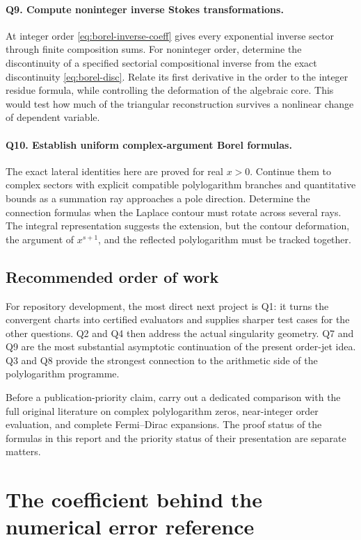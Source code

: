 \documentclass[11pt,a4paper]{article}
\numberwithin{equation}{section}
\theoremstyle{definition}
\theoremstyle{remark}
\begin{document}
\paragraph{Q9. Compute noninteger inverse Stokes transformations.}
At integer order \eqref{eq:borel-inverse-coeff} gives every
exponential inverse sector through finite composition sums.
For noninteger order, determine the discontinuity of a specified
sectorial compositional inverse from the exact discontinuity
\eqref{eq:borel-disc}. Relate its first derivative in the order
to the integer residue formula, while controlling the deformation
of the algebraic core. This would test how much of the triangular
reconstruction survives a nonlinear change of dependent variable.

\paragraph{Q10. Establish uniform complex-argument Borel formulas.}
The exact lateral identities here are proved for real $x>0$.
Continue them to complex sectors with explicit compatible
polylogarithm branches and quantitative bounds as a summation
ray approaches a pole direction. Determine the connection
formulas when the Laplace contour must rotate across several
rays. The integral representation suggests the extension, but
the contour deformation, the argument of $x^{s+1}$, and the
reflected polylogarithm must be tracked together.

\subsection{Recommended order of work}

For repository development, the most direct next project is Q1:
it turns the convergent charts into certified evaluators and
supplies sharper test cases for the other questions. Q2 and Q4
then address the actual singularity geometry. Q7 and Q9 are the
most substantial asymptotic continuation of the present order-jet
idea. Q3 and Q8 provide the strongest connection to the arithmetic
side of the polylogarithm programme.

Before a publication-priority claim, carry out a dedicated comparison
with the full original literature on complex polylogarithm zeros,
near-integer order evaluation, and complete Fermi--Dirac expansions.
The proof status of the formulas in this report and the priority
status of their presentation are separate matters.


\appendix
\section{The coefficient behind the numerical error reference}
\label{app:figure-coefficient}
\end{document}
